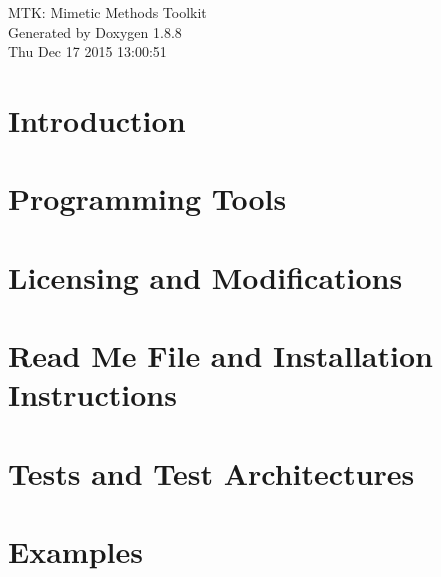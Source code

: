 \documentclass[twoside]{book}
\newcommand{\+}{\discretionary{\mbox{\scriptsize$\hookleftarrow$}}{}{}}
\newcommand{\clearemptydoublepage}{%
  \newpage{\pagestyle{empty}\cleardoublepage}%
}
\begin{document}
\hypersetup{pageanchor=false,
             bookmarks=true,
             bookmarksnumbered=true,
             pdfencoding=unicode
            }
\begin{titlepage}
\vspace*{7cm}
\begin{center}%
{\Large M\+T\+K\+: Mimetic Methods Toolkit }\\
\vspace*{1cm}
{\large Generated by Doxygen 1.8.8}\\
\vspace*{0.5cm}
{\small Thu Dec 17 2015 13:00:51}\\
\end{center}
\end{titlepage}
\clearemptydoublepage
\tableofcontents
\clearemptydoublepage
{}
\hypersetup{pageanchor=true}

\chapter{Introduction}
\label{index}\hypertarget{index}{}
\chapter{Programming Tools}
\label{section_prog_tools}
\hypertarget{section_prog_tools}{}

\chapter{Licensing and Modifications}
\label{section_license_mod}
\hypertarget{section_license_mod}{}

\chapter{Read Me File and Installation Instructions}
\label{page_readme}
\hypertarget{page_readme}{}

\chapter{Tests and Test Architectures}
\label{page_architectures}
\hypertarget{page_architectures}{}

\chapter{Examples}
\label{page_examples}
\hypertarget{page_examples}{}

\end{document}
